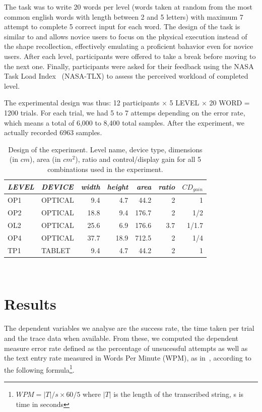 \documentclass{chi-ext}
\newcommand{\smit}[1]{{\small\textit{{#1}}}}
\newcommand{\cdt}[1]{{\small\uppercase{{#1}}}}
\begin{document}
The task was to write 20 words per level (words taken at random from the most common english words with length between 2 and 5 letters) with maximum 7 attempt to complete 5 correct input for each word. The design of the task is similar to \cite{Quinn2016} and allows novice users to focus on the physical execution instead of the shape recollection, effectively emulating a proficient bahavior even for novice users. After each level, participants were offered to take a break before moving to the next one. Finally, participants were asked for their feedback using the NASA Task Load Index~\cite{Hart1988} (NASA-TLX) to assess the perceived workload of completed level.

The experimental design was thus: 12 participants $\times$ 5 \cdt{level} $\times$ 20 \cdt{word} = 1200 trials. For each trial, we had 5 to 7 attemps depending on the error rate, which means a total of 6,000 to 8,400 total samples. After the experiment, we actually recorded 6963 samples.

\begin{table}
  \centering
  \begin{tabular}{l l | r r r r r}
    \smit{LEVEL} & \smit{DEVICE} & \smit{width} & \smit{height} & \smit{area}& \smit{ratio} & \smit{$CD_{gain}$} \\
    \hline
    \cdt{OP1} & \cdt{optical} & 9.4 & 4.7 & 44.2 & 2 & 1 \\
    \cdt{OP2} & \cdt{optical} & 18.8 & 9.4 & 176.7 & 2 & 1/2 \\
    \cdt{OL2} & \cdt{optical} & 25.6 & 6.9 & 176.6 & 3.7 & 1/1.7 \\
    \cdt{OP4} & \cdt{optical} & 37.7 & 18.9 & 712.5 & 2 & 1/4 \\
    \hline
    \cdt{tp1} & \cdt{tablet} & 9.4 & 4.7 & 44.2 & 2 & 1 \\
  \end{tabular}
  \caption{Design of the experiment. Level name, device type, dimensions (in $cm$), area (in $cm^2$), ratio and control/display gain for all 5 combinations used in the experiment.}~\label{tab:cdt}
\end{table}

\section{Results}
The dependent variables we analyse are the success rate, the time taken per trial and the trace data when available. From these, we computed the dependent measure error rate defined as the percentage of unsucessful attempts as well as the text entry rate measured in Words Per Minute (WPM), as in~\cite{Markussen2014}, according to the following formula\footnote{$WPM = |T|/s \times 60/5$ where $|T|$ is the length of the transcribed string, s is time in seconds}.
\end{document}
